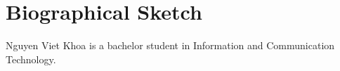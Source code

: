 \chapter*{Biographical Sketch}

Nguyen Viet Khoa is a bachelor student in Information and Communication Technology.